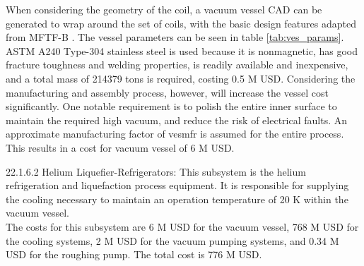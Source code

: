 When considering the geometry of the coil, a vacuum vessel CAD can be generated to wrap around the set of coils, with the basic design features adapted from MFTF-B \cite{gerich1986design}. The vessel parameters can be seen in table \ref{tab:ves_params}. ASTM A240 Type-304 stainless steel is used because it is nonmagnetic, has good fracture toughness and welding properties, is readily available and inexpensive, and a total mass of 214379 tons is required, costing 0.5 M USD. Considering the manufacturing and assembly process, however, will increase the vessel cost significantly. One notable requirement is to polish the entire inner surface to maintain the required high vacuum, and reduce the risk of electrical faults. An approximate manufacturing factor of vesmfr is assumed for the entire process. This results in a cost for vacuum vessel of 6 M USD.


\begin{table}[h]
    \centering
    \caption{Vacuum vessel parameters.}
    \label{tab:ves_params}
\end{table}



22.1.6.2 Helium Liquefier-Refrigerators: This subsystem is the helium refrigeration and liquefaction process equipment. It is responsible for supplying the cooling necessary to maintain an operation temperature of 20 K within the vacuum vessel. \\

The costs for this subsystem are 6 M USD for the vacuum vessel, 768 M USD for the cooling systems, 2 M USD for the vacuum pumping systems, and 0.34 M USD for the roughing pump. The total cost is 776 M USD.\\

